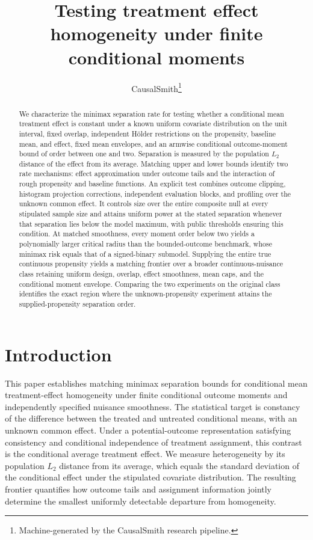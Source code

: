 \documentclass[11pt]{article}
\title{Testing treatment effect homogeneity under finite conditional moments}
\author{CausalSmith\thanks{Machine-generated by the CausalSmith research pipeline.}}
\date{\cspaperdate}
\begin{document}
\maketitle

\begin{abstract}
We characterize the minimax separation rate for testing whether a conditional mean treatment effect is constant under a known uniform covariate distribution on the unit interval, fixed overlap, independent Hölder restrictions on the propensity, baseline mean, and effect, fixed mean envelopes, and an armwise conditional outcome-moment bound of order between one and two. Separation is measured by the population \(L_2\) distance of the effect from its average. Matching upper and lower bounds identify two rate mechanisms: effect approximation under outcome tails and the interaction of rough propensity and baseline functions. An explicit test combines outcome clipping, histogram projection corrections, independent evaluation blocks, and profiling over the unknown common effect. It controls size over the entire composite null at every stipulated sample size and attains uniform power at the stated separation whenever that separation lies below the model maximum, with public thresholds ensuring this condition. At matched smoothness, every moment order below two yields a polynomially larger critical radius than the bounded-outcome benchmark, whose minimax risk equals that of a signed-binary submodel. Supplying the entire true continuous propensity yields a matching frontier over a broader continuous-nuisance class retaining uniform design, overlap, effect smoothness, mean caps, and the conditional moment envelope. Comparing the two experiments on the original class identifies the exact region where the unknown-propensity experiment attains the supplied-propensity separation order.
\end{abstract}

\section{Introduction}

This paper establishes matching minimax separation bounds for conditional mean treatment-effect homogeneity under finite conditional outcome moments and independently specified nuisance smoothness. The statistical target is constancy of the difference between the treated and untreated conditional means, with an unknown common effect. Under a potential-outcome representation satisfying consistency and conditional independence of treatment assignment, this contrast is the conditional average treatment effect. We measure heterogeneity by its population \(L_2\) distance from its average, which equals the standard deviation of the conditional effect under the stipulated covariate distribution. The resulting frontier quantifies how outcome tails and assignment information jointly determine the smallest uniformly detectable departure from homogeneity.
\end{document}

